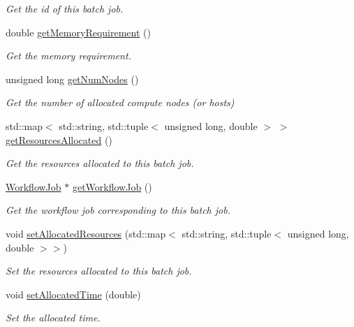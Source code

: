 \begin{DoxyCompactItemize}
\begin{DoxyCompactList}\small\item\em Get the id of this batch job. \end{DoxyCompactList}\item 
double \hyperlink{classwrench_1_1_batch_job_abb349b19cdc9975d98227dffbe146bfc}{get\+Memory\+Requirement} ()
\begin{DoxyCompactList}\small\item\em Get the memory requirement. \end{DoxyCompactList}\item 
unsigned long \hyperlink{classwrench_1_1_batch_job_abf624dffc6a004f015bd5b6fbdf17c94}{get\+Num\+Nodes} ()
\begin{DoxyCompactList}\small\item\em Get the number of allocated compute nodes (or hosts) \end{DoxyCompactList}\item 
std\+::map$<$ std\+::string, std\+::tuple$<$ unsigned long, double $>$ $>$ \hyperlink{classwrench_1_1_batch_job_a22557f2dea0008e1f985b4a373868490}{get\+Resources\+Allocated} ()
\begin{DoxyCompactList}\small\item\em Get the resources allocated to this batch job. \end{DoxyCompactList}\item 
\hyperlink{classwrench_1_1_workflow_job}{Workflow\+Job} $\ast$ \hyperlink{classwrench_1_1_batch_job_a5ee5804010f310bf636f7569c3ed80c0}{get\+Workflow\+Job} ()
\begin{DoxyCompactList}\small\item\em Get the workflow job corresponding to this batch job. \end{DoxyCompactList}\item 
void \hyperlink{classwrench_1_1_batch_job_adeb38beecfec84bb2e9022d20624ecd0}{set\+Allocated\+Resources} (std\+::map$<$ std\+::string, std\+::tuple$<$ unsigned long, double $>$$>$)
\begin{DoxyCompactList}\small\item\em Set the resources allocated to this batch job. \end{DoxyCompactList}\item 
void \hyperlink{classwrench_1_1_batch_job_a759f6aa97bfa5fdcfe8a3201a698c885}{set\+Allocated\+Time} (double)
\begin{DoxyCompactList}\small\item\em Set the allocated time. \end{DoxyCompactList}\item 
$$
\end{DoxyCompactItemize}
